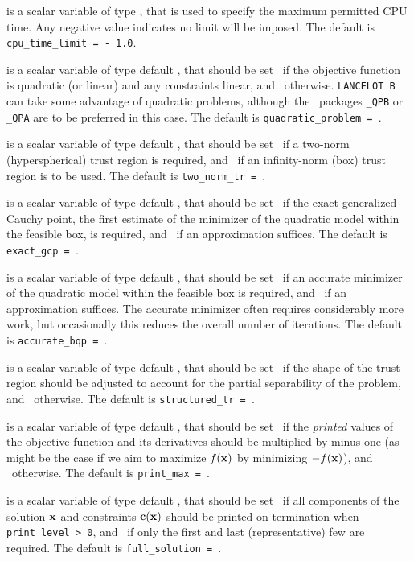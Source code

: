 \documentclass{galahad}
\newcommand{\packagename}{LANCELOT B}
\begin{document}
\begin{description}
 is a scalar variable of type \realdp,
that is used to specify the maximum permitted CPU time. Any negative
value indicates no limit will be imposed. The default is
{\tt cpu\_time\_limit = - 1.0}.

 is a scalar variable of type default \logical, that
should be set \true\ if the objective function is quadratic (or linear)
and any constraints linear, and \false\ otherwise. {\tt \packagename} can
take some advantage of quadratic problems, although the \galahad\ packages
{\tt \libraryname\_QPB} or {\tt \libraryname\_QPA} are to be preferred
in this case.
The default is {\tt quadratic\_problem = \false}.

 is a scalar variable of type default \logical, that should
be set \true\ if a two-norm (hyperspherical) trust region is
required, and \false\ if an infinity-norm (box)
trust region is to be used.
The default is {\tt two\_norm\_tr = \false}.

 is a scalar variable of type default \logical, that should
be set \true\ if the exact generalized Cauchy point,
the first estimate of the minimizer of the quadratic model within
the feasible box, is required, and \false\ if an approximation suffices.
The default is {\tt exact\_gcp = \true}.

 is a scalar variable of type default \logical, that should
be set \true\ if an accurate minimizer of the
quadratic model within the feasible box is required, and
\false\ if an approximation suffices. The accurate minimizer often
requires considerably more work, but occasionally this reduces the overall
number of iterations.
The default is {\tt accurate\_bqp = \false}.

 is a scalar variable of type default \logical, that should
be set \true\ if the shape of the trust region should be adjusted to
account for the partial separability of the problem,
and \false\ otherwise.
The default is {\tt structured\_tr = \false}.

 is a scalar variable of type default \logical, that should
be set \true\ if the {\em printed} values of the objective function and its
derivatives should be multiplied by minus one (as might be the case if
we aim to maximize $f({\mathbf{x}})$ by minimizing $-f({\mathbf{x}})$), and \false\ otherwise.
The default is {\tt print\_max = \false}.

 is a scalar variable of type default \logical, that should
be set \true\ if all components of the solution ${\mathbf{x}}$ and constraints
${\mathbf{c}}({\mathbf{x}})$ should be printed on termination when {\tt print\_level > 0},
and \false\ if only the first and last (representative) few are required.
The default is {\tt full\_solution = \true}.


\end{description}
\end{document}
